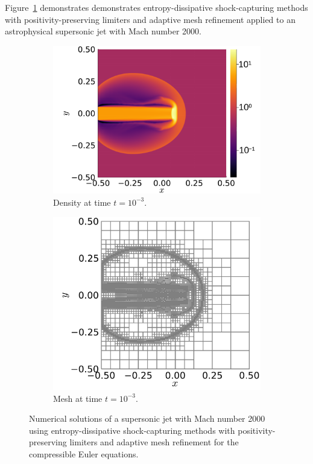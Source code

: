 \documentclass{juliacon}
\begin{document}
Figure~\ref{fig:jet} demonstrates demonstrates entropy-dissipative shock-capturing
methods with positivity-preserving limiters and adaptive mesh refinement applied
to an astrophysical supersonic jet with Mach number 2000.
\begin{figure}[!h]
  \begin{subfigure}{0.53\linewidth}
    \includegraphics[width=\textwidth]{../figures/jet_density}
    \caption{Density at time $t = 10^{-3}$.}
  \end{subfigure}%
  \hspace*{\fill}
  \begin{subfigure}{0.47\linewidth}
    \includegraphics[width=\textwidth]{../figures/jet_mesh}
    \caption{Mesh at time $t = 10^{-3}$.}
  \end{subfigure}%
  \caption{Numerical solutions of a supersonic jet with Mach number 2000 using
           entropy-dissipative shock-capturing methods with positivity-preserving
           limiters and adaptive mesh refinement for the compressible Euler equations.}
  \label{fig:jet}
\end{figure}
\end{document}

